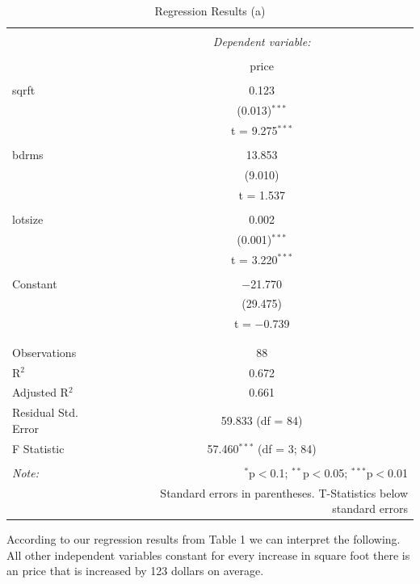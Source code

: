 \documentclass[
  12pt,
  landscape]{article}
\begin{document}
\begin{table}[!htbp] \centering 
  \caption{Regression Results (a)} 
  \label{} 
\begin{tabular}{@{\extracolsep{5pt}}lc} 
\\[-1.8ex]\hline 
\hline \\[-1.8ex] 
 & \multicolumn{1}{c}{\textit{Dependent variable:}} \\ 
\cline{2-2} 
\\[-1.8ex] & price \\ 
\hline \\[-1.8ex] 
 sqrft & 0.123 \\ 
  & (0.013)$^{***}$ \\ 
  & t = 9.275$^{***}$ \\ 
  & \\ 
 bdrms & 13.853 \\ 
  & (9.010) \\ 
  & t = 1.537 \\ 
  & \\ 
 lotsize & 0.002 \\ 
  & (0.001)$^{***}$ \\ 
  & t = 3.220$^{***}$ \\ 
  & \\ 
 Constant & $-$21.770 \\ 
  & (29.475) \\ 
  & t = $-$0.739 \\ 
  & \\ 
\hline \\[-1.8ex] 
Observations & 88 \\ 
R$^{2}$ & 0.672 \\ 
Adjusted R$^{2}$ & 0.661 \\ 
Residual Std. Error & 59.833 (df = 84) \\ 
F Statistic & 57.460$^{***}$ (df = 3; 84) \\ 
\hline 
\hline \\[-1.8ex] 
\textit{Note:}  & \multicolumn{1}{r}{$^{*}$p$<$0.1; $^{**}$p$<$0.05; $^{***}$p$<$0.01} \\ 
 & \multicolumn{1}{r}{Standard errors in parentheses. T-Statistics below standard errors} \\ 
\end{tabular} 
\end{table}

According to our regression results from Table 1 we can interpret the
following. All other independent variables constant for every increase
in square foot there is an price that is increased by 123 dollars on
average.
\end{document}
